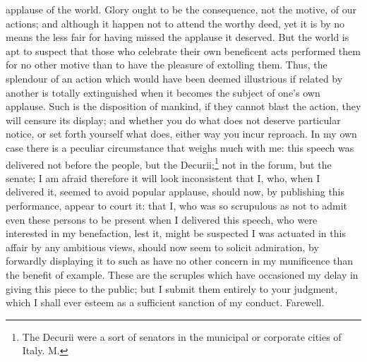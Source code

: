 applause of the world. Glory ought to be the consequence, not the motive,
of our actions; and although it happen not to attend the worthy deed, yet
it is by no means the less fair for having missed the applause it
deserved. But the world is apt to suspect that those who celebrate their
own beneficent acts performed them for no other motive than to have the
pleasure of extolling them. Thus, the splendour of an action which would
have been deemed illustrious if related by another is totally extinguished
when it becomes the subject of one's own applause. Such is the disposition
of mankind, if they cannot blast the action, they will censure its
display; and whether you do what does not deserve particular notice, or
set forth yourself what does, either way you incur reproach. In my own
case there is a peculiar circumstance that weighs much with me: this
speech was delivered not before the people, but the Decurii;\footnote{The Decurii were a sort of
senators in the municipal or corporate cities of Italy. M.} not in
the forum, but the senate; I am afraid therefore it will look inconsistent
that I, who, when I delivered it, seemed to avoid popular applause, should
now, by publishing this performance, appear to court it: that I, who was
so scrupulous as not to admit even these persons to be present when I
delivered this speech, who were interested in my benefaction, lest it,
might be suspected I was actuated in this affair by any ambitious views,
should now seem to solicit admiration, by forwardly displaying it to such
as have no other concern in my munificence than the benefit of example.
These are the scruples which have occasioned my delay in giving this piece
to the public; but I submit them entirely to your judgment, which I shall
ever esteem as a sufficient sanction of my conduct. Farewell.



